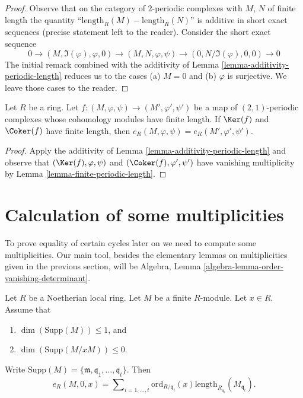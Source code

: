 \begin{proof}
Observe that on the category of $2$-periodic complexes with $M$, $N$
of finite length the quantity ``$\text{length}_R(M) - \text{length}_R(N)$''
is additive in short exact sequences (precise statement left to the reader).
Consider the short exact sequence
$$
0 \to (M, \Im(\varphi), \varphi, 0) \to
(M, N, \varphi, \psi) \to (0, N/\Im(\varphi), 0, 0) \to 0
$$
The initial remark combined with the additivity of
Lemma \ref{lemma-additivity-periodic-length}
reduces us to the cases (a) $M = 0$ and (b) $\varphi$ is surjective.
We leave those cases to the reader.
\end{proof}

\begin{lemma}
\label{lemma-compare-periodic-lengths}
Let $R$ be a ring. Let $f : (M, \varphi, \psi) \to (M', \varphi', \psi')$
be a map of $(2, 1)$-periodic complexes whose cohomology modules
have finite length. If $\Ker(f)$ and $\Coker(f)$ have finite length,
then $e_R(M, \varphi, \psi) = e_R(M', \varphi', \psi')$.
\end{lemma}

\begin{proof}
Apply the additivity of Lemma \ref{lemma-additivity-periodic-length}
and observe that $(\Ker(f), \varphi, \psi)$ and
$(\Coker(f), \varphi', \psi')$ have vanishing multiplicity by
Lemma \ref{lemma-finite-periodic-length}.
\end{proof}




\section{Calculation of some multiplicities}
\label{section-calculation}

\noindent
To prove equality of certain cycles later on we need to
compute some multiplicities. Our main tool, besides the
elementary lemmas on multiplicities given in the previous section,
will be Algebra, Lemma \ref{algebra-lemma-order-vanishing-determinant}.

\begin{lemma}
\label{lemma-length-multiplication}
Let $R$ be a Noetherian local ring.
Let $M$ be a finite $R$-module. Let $x \in R$. Assume that
\begin{enumerate}
\item $\dim(\text{Supp}(M)) \leq 1$, and
\item $\dim(\text{Supp}(M/xM)) \leq 0$.
\end{enumerate}
Write
$\text{Supp}(M) = \{\mathfrak m, \mathfrak q_1, \ldots, \mathfrak q_t\}$.
Then
$$
e_R(M, 0, x) =
\sum\nolimits_{i = 1, \ldots, t}
\text{ord}_{R/\mathfrak q_i}(x)
\text{length}_{R_{\mathfrak q_i}}(M_{\mathfrak q_i}).
$$
\end{lemma}

